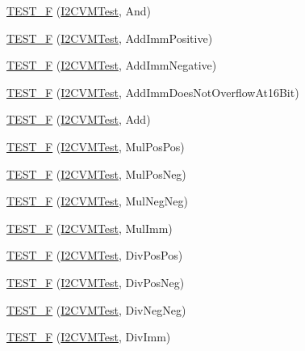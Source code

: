 \begin{DoxyCompactItemize}
\item 
\hyperlink{group___unit_tests_gadef92e19394b5187e64aa9673b4a12ed}{\-T\-E\-S\-T\-\_\-\-F} (\hyperlink{class_i2_c_v_m_test}{\-I2\-C\-V\-M\-Test}, \-And)
\item 
\hyperlink{group___unit_tests_ga0d9ace46337e18e51615a40e0aa8d829}{\-T\-E\-S\-T\-\_\-\-F} (\hyperlink{class_i2_c_v_m_test}{\-I2\-C\-V\-M\-Test}, \-Add\-Imm\-Positive)
\item 
\hyperlink{group___unit_tests_gad8c282d88cb4f0088a9a4119db2cd1e8}{\-T\-E\-S\-T\-\_\-\-F} (\hyperlink{class_i2_c_v_m_test}{\-I2\-C\-V\-M\-Test}, \-Add\-Imm\-Negative)
\item 
\hyperlink{group___unit_tests_ga9829ebf2ae65488e6ccf160935366f67}{\-T\-E\-S\-T\-\_\-\-F} (\hyperlink{class_i2_c_v_m_test}{\-I2\-C\-V\-M\-Test}, \-Add\-Imm\-Does\-Not\-Overflow\-At16\-Bit)
\item 
\hyperlink{group___unit_tests_ga5b89dd714658a53cd8aac63b369eb4d6}{\-T\-E\-S\-T\-\_\-\-F} (\hyperlink{class_i2_c_v_m_test}{\-I2\-C\-V\-M\-Test}, \-Add)
\item 
\hyperlink{group___unit_tests_gacce37e91388f64c77a7639840f41ec16}{\-T\-E\-S\-T\-\_\-\-F} (\hyperlink{class_i2_c_v_m_test}{\-I2\-C\-V\-M\-Test}, \-Mul\-Pos\-Pos)
\item 
\hyperlink{group___unit_tests_ga894251de250d7fca8fa49e2777bf1d14}{\-T\-E\-S\-T\-\_\-\-F} (\hyperlink{class_i2_c_v_m_test}{\-I2\-C\-V\-M\-Test}, \-Mul\-Pos\-Neg)
\item 
\hyperlink{group___unit_tests_gad5b94d4470f9d8171e7e6e2b13e15f74}{\-T\-E\-S\-T\-\_\-\-F} (\hyperlink{class_i2_c_v_m_test}{\-I2\-C\-V\-M\-Test}, \-Mul\-Neg\-Neg)
\item 
\hyperlink{group___unit_tests_gab41e406d8e82ae50d4f4e996fc61aa23}{\-T\-E\-S\-T\-\_\-\-F} (\hyperlink{class_i2_c_v_m_test}{\-I2\-C\-V\-M\-Test}, \-Mul\-Imm)
\item 
\hyperlink{group___unit_tests_gae742693ab9cdf6d9aa60587eecd23cc3}{\-T\-E\-S\-T\-\_\-\-F} (\hyperlink{class_i2_c_v_m_test}{\-I2\-C\-V\-M\-Test}, \-Div\-Pos\-Pos)
\item 
\hyperlink{group___unit_tests_gada8a4a6bad23c5bbd0bfb9f7081db885}{\-T\-E\-S\-T\-\_\-\-F} (\hyperlink{class_i2_c_v_m_test}{\-I2\-C\-V\-M\-Test}, \-Div\-Pos\-Neg)
\item 
\hyperlink{group___unit_tests_ga4c34c8b941370225deb56e1abddc0c6c}{\-T\-E\-S\-T\-\_\-\-F} (\hyperlink{class_i2_c_v_m_test}{\-I2\-C\-V\-M\-Test}, \-Div\-Neg\-Neg)
\item 
\hyperlink{group___unit_tests_ga90e589865b97c8090278acc057a5aa19}{\-T\-E\-S\-T\-\_\-\-F} (\hyperlink{class_i2_c_v_m_test}{\-I2\-C\-V\-M\-Test}, \-Div\-Imm)

\end{DoxyCompactItemize}
